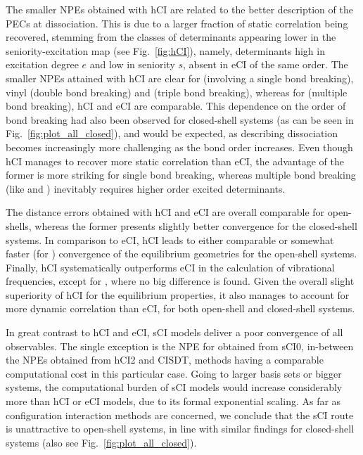 \documentclass[aip,jcp,reprint,noshowkeys,superscriptaddress]{revtex4-1}
\begin{document}
The smaller NPEs obtained with hCI are related to the better description of the PECs at dissociation.
This is due to a larger fraction of static correlation being recovered,
stemming from the classes of determinants appearing lower in the seniority-excitation map (see Fig.~\ref{fig:hCI}),
namely, determinants high in excitation degree $e$ and low in seniority $s$, absent in eCI of the same order.
The smaller NPEs attained with hCI are clear for  (involving a single bond breaking),
vinyl (double bond breaking) and  (triple bond breaking),
whereas for  (multiple bond breaking), hCI and eCI are comparable.
This dependence on the order of bond breaking had also been observed for closed-shell systems \cite{Kossoski_2022} (as can be seen in Fig.~\ref{fig:plot_all_closed}),
and would be expected, as describing dissociation becomes increasingly more challenging as the bond order increases.
Even though hCI manages to recover more static correlation than eCI,
the advantage of the former is more striking for single bond breaking, whereas multiple bond breaking (like  and ) inevitably requires higher order excited determinants.

The distance errors obtained with hCI and eCI are overall comparable for open-shells, whereas the former presents slightly better convergence for the closed-shell systems.
In comparison to eCI, hCI leads to either comparable or somewhat faster (for ) convergence of the equilibrium geometries for the open-shell systems.
Finally, hCI systematically outperforms eCI in the calculation of vibrational frequencies, except for , where no big difference is found.
Given the overall slight superiority of hCI for the equilibrium properties, it also manages to account for more dynamic correlation than eCI,
for both open-shell and closed-shell systems.

In great contrast to hCI and eCI, sCI models deliver a poor convergence of all observables.
The single exception is the NPE for  obtained from sCI0, in-between the NPEs obtained from hCI2 and CISDT, methods having a comparable computational cost in this particular case.
Going to larger basis sets or bigger systems, the computational burden of sCI models would increase considerably more than hCI or eCI models,
due to its formal exponential scaling.
As far as configuration interaction methods are concerned, we conclude that the sCI route is unattractive to open-shell systems,
in line with similar findings for closed-shell systems \cite{Kossoski_2022} (also see Fig.~\ref{fig:plot_all_closed}).
\end{document}
